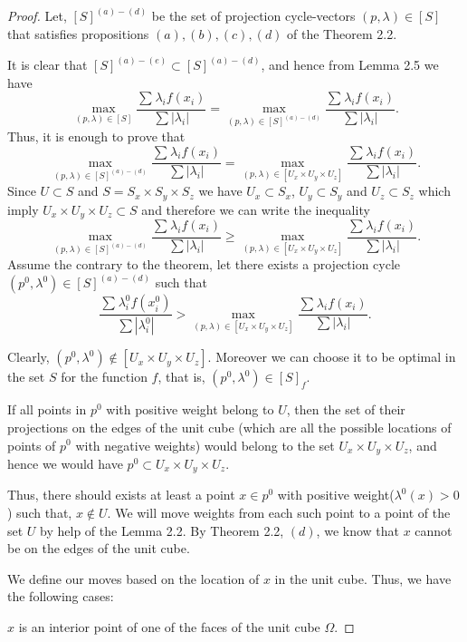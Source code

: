 \documentclass[12p]{article}
\numberwithin{equation}{section}
\begin{document}
\begin{proof}
Let, \([S]^{(a)-(d)}\) be the set of projection cycle-vectors \((p,\lambda) \in [S]\) that satisfies propositions \((a),(b),(c),(d)\) of the Theorem 2.2.

It is clear that \([S]^{(a)-(e)} \subset [S]^{(a)-(d)}\), and hence from Lemma 2.5 we have
\[
\max_{(p,\lambda)\in [S] }\frac{\sum_{}\lambda_if(x_i)}{\sum|\lambda_i|}=\max_{(p,\lambda)\in [S]^{(a)-(d)} }\frac{\sum_{}\lambda_if(x_i)}{\sum|\lambda_i|}.
\]
Thus, it is enough to prove that
\[
\max_{(p,\lambda)\in [S]^{(a)-(d)} }\frac{\sum_{}\lambda_if(x_i)}{\sum|\lambda_i|}=\max_{(p,\lambda) \in [U_x\times U_y \times U_z]}\frac{\sum_{} \lambda_if(x_i)}{\sum|\lambda_i|}.
\]
Since \(U \subset S\) and \(S=S_x \times S_y \times S_z\) we have \(U_x \subset S_x\), \(U_y \subset S_y\) and \(U_z \subset S_z\) which imply \(U_x\times U_y \times U_z \subset S\) and therefore we can write the inequality
\[
\max_{(p,\lambda)\in [S]^{(a)-(d)} }\frac{\sum_{}\lambda_if(x_i)}{\sum|\lambda_i|} \ge \max_{(p,\lambda) \in [U_x\times U_y \times U_z]}\frac{\sum_{} \lambda_if(x_i)}{\sum|\lambda_i|}.
\]
Assume the contrary to the theorem, let there exists a projection cycle \((p^0,\lambda^0) \in [S]^{(a)-(d)}\) such that
\begin{equation} \label{e: contrary assumption}
    \frac{\sum_{}\lambda^0_if(x^0_i)}{\sum|\lambda^0_i|} > \max_{(p,\lambda) \in [U_x\times U_y \times U_z]}\frac{\sum_{} \lambda_if(x_i)}{\sum|\lambda_i|}. 
\end{equation}
 
Clearly, \((p^0,\lambda^0) \not \in [U_x\times U_y \times U_z]\). Moreover we can choose it to be optimal in the set \(S\) for the  function \(f\), that is, \((p^0,\lambda^0) \in [S]_f\).

If all points in \(p^0\) with positive weight belong to \(U\), then the set of their projections on the edges of the unit cube (which are all the possible locations of points of \(p^0\) with negative weights)  would belong to the set \(U_x \times U_y \times U_z\), and hence we would have \(p^0 \subset U_x \times U_y \times U_z\).

Thus, there should exists at least a point \(x \in p^0\) with positive weight(\(\lambda^0(x)>0\)) such that, \(x \not \in U\). We will move weights from each such point to a point of the set \(U\) by help of the Lemma 2.2. By Theorem 2.2, \((d)\), we know that \(x\) cannot be on the edges of the unit cube. 

We define our moves based on the location of \(x\) in the unit cube. Thus, we have the following cases:
\item[\textbf{Case 1:}] \(x\) is an interior point of one of the faces of the unit cube \(\Omega\).


\end{proof}
\end{document}
